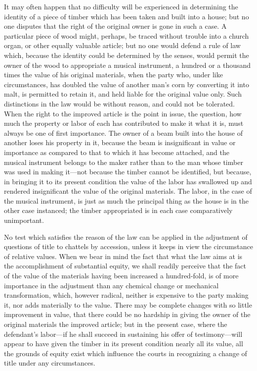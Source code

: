 It may often happen that no difficulty will be experienced in determining the
identity of a piece of timber which has been taken and built into a house; but
no one disputes that the right of the original owner is gone in such a case. A
particular piece of wood might, perhaps, be traced without trouble into a
church organ, or other equally valuable article; but no one would defend a rule
of law which, because the identity could be determined by the senses, would
permit the owner of the wood to appropriate a musical instrument, a hundred or
a thousand times the value of his original materials, when the party who, under
like circumstances, has doubled the value of another man's corn by converting
it into malt, is permitted to retain it, and held liable for the original value
only. Such distinctions in the law would be without reason, and could not be
tolerated. When the right to the improved article is the point in issue, the
question, how much the property or labor of each has contributed to make it
what it is, must always be one of first importance. The owner of a beam built
into the house of another loses his property in it, because the beam is
insignificant in value or importance as compared to that to which it has become
attached, and the musical instrument belongs to the maker rather than to the
man whose timber was used in making it---not because the timber cannot be
identified, but because, in bringing it to its present condition the value of
the labor has swallowed up and rendered insignificant the value of the original
materials. The labor, in the case of the musical instrument, is just as much
the principal thing as the house is in the other case instanced; the timber
appropriated is in each case comparatively unimportant.

No test which satisfies the reason of the law can be applied in the adjustment
of questions of title to chattels by accession, unless it keeps in view the
circumstance of relative values. When we bear in mind the fact that what the
law aims at is the accomplishment of substantial equity, we shall readily
perceive that the fact of the value of the materials having been increased a
hundred-fold, is of more importance in the adjustment than any chemical change
or mechanical transformation, which, however radical, neither is expensive to
the party making it, nor adds materially to the value. There may be complete
changes with so little improvement in value, that there could be no hardship in
giving the owner of the original materials the improved article; but in the
present case, where the defendant's labor---if he shall succeed in sustaining
his offer of testimony---will appear to have given the timber in its present
condition nearly all its value, all the grounds of equity exist which influence
the courts in recognizing a change of title under any circumstances.

